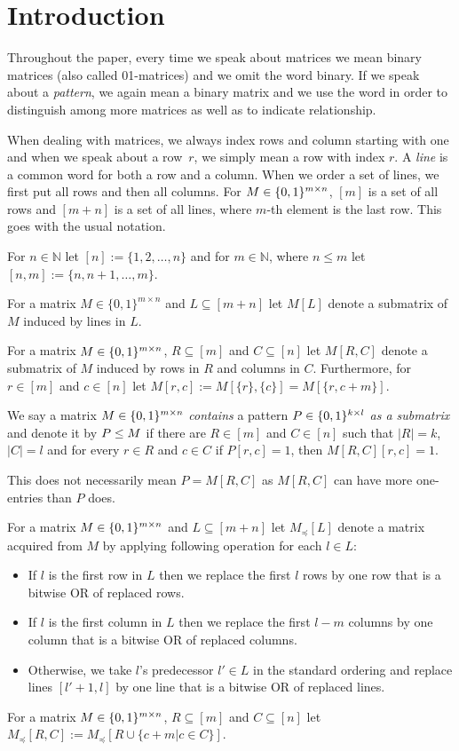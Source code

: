 \chapter*{Introduction}
Throughout the paper, every time we speak about matrices we mean binary matrices (also called 01-matrices) and we omit the word binary. If we speak about a \emph{pattern}, we again mean a binary matrix and we use the word in order to distinguish among more matrices as well as to indicate relationship.

When dealing with matrices, we always index rows and column starting with one and when we speak about a row~$r$, we simply mean a row with index $r$. A \emph{line} is a common word for both a row and a column. When we order a set of lines, we first put all rows and then all columns. For $M\in\{0,1\}^{m\times n}$, $[m]$ is a set of all rows and $[m+n]$ is a set of all lines, where $m$-th element is the last row. This goes with the usual notation.
\begin{ntn}
For $n\in\mathbb{N}$ let $[n]:=\{1,2,\dots,n\}$ and for $m\in\mathbb{N}$, where $n\leq m$ let $[n,m]:=\{n,n+1,\dots,m\}$.
\end{ntn}
\begin{ntn}
For a matrix $M\in\{0,1\}^{m\times n}$ and $L\subseteq[m+n]$ let $M[L]$ denote a submatrix of $M$ induced by lines in $L$.
\end{ntn}
\begin{ntn}
For a matrix $M\in\{0,1\}^{m\times n}$, $R\subseteq[m]$ and $C\subseteq[n]$ let $M[R,C]$ denote a submatrix of $M$ induced by rows in $R$ and columns in $C$. Furthermore, for $r\in[m]$ and $c\in[n]$ let $M[r,c]:=M[\{r\},\{c\}]=M[\{r,c+m\}]$.
\end{ntn}
\begin{defn}
We say a matrix $M\in\{0,1\}^{m\times n}$ \emph{contains} a pattern $P\in\{0,1\}^{k\times l}$ \emph{as a submatrix} and denote it by $P\leq M$ if there are $R\in[m]$ and $C\in[n]$ such that $|R|=k$, $|C|=l$ and for every $r\in R$ and $c\in C$ if $P[r,c]=1$, then $M[R,C][r,c]=1$.
\end{defn}
This does not necessarily mean $P=M[R,C]$ as $M[R,C]$ can have more one-entries than $P$ does.
\begin{ntn}
For a matrix $M\in\{0,1\}^{m\times n}$ and $L\subseteq[m+n]$ let $M_{\preceq}[L]$ denote a matrix acquired from $M$ by applying following operation for each $l\in L$:
\begin{itemize}
\item If $l$ is the first row in $L$ then we replace the first $l$ rows by one row that is a bitwise OR of replaced rows.
\item If $l$ is the first column in $L$ then we replace the first $l-m$ columns by one column that is a bitwise OR of replaced columns.
\item Otherwise, we take $l$'s predecessor $l'\in L$ in the standard ordering and replace lines $[l'+1,l]$ by one line that is a bitwise OR of replaced lines.
\end{itemize}
\end{ntn}
\begin{ntn}
For a matrix $M\in\{0,1\}^{m\times n}$, $R\subseteq[m]$ and $C\subseteq[n]$ let $M_{\preceq}[R,C]:=M_{\preceq}[R\cup \{c+m|c\in C\}]$.
\end{ntn}

